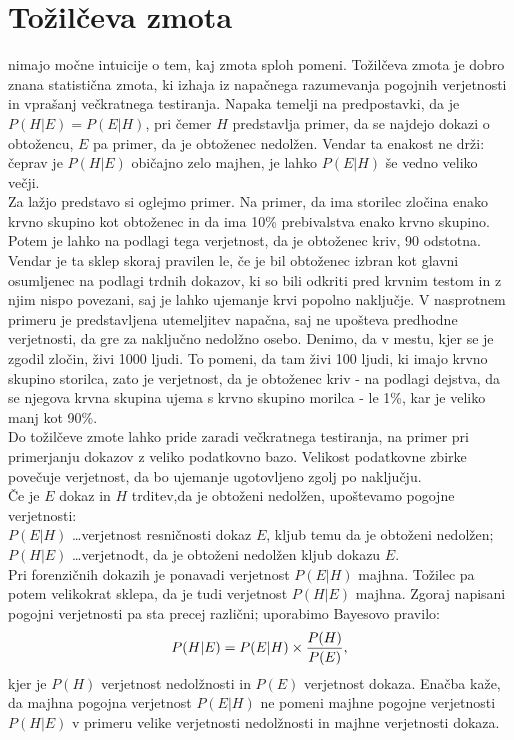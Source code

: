 \documentclass[12pt,a4paper]{amsart}
\theoremstyle{definition} %
\theoremstyle{plain} %
\begin{document}
\section{Tožilčeva zmota}
nimajo močne intuicije o tem, kaj zmota sploh pomeni. Tožilčeva zmota je dobro znana statistična zmota, ki izhaja iz napačnega razumevanja 
pogojnih verjetnosti in vprašanj večkratnega testiranja. Napaka temelji na predpostavki, da je $P(H \lvert E) = P(E \lvert H)$, pri čemer $H$ 
predstavlja primer, da se najdejo dokazi o obtožencu, $E$ pa primer, da je obtoženec nedolžen. Vendar ta enakost ne drži: čeprav je $P(H \lvert E)$ 
običajno zelo majhen, je lahko $P(E \lvert H)$ še vedno veliko večji. \\

Za lažjo predstavo si oglejmo primer. Na primer, da ima storilec zločina enako krvno skupino kot obtoženec in da ima 10\% prebivalstva 
enako krvno skupino. Potem je lahko na podlagi tega verjetnost, da je obtoženec kriv, 90 odstotna. Vendar je ta sklep skoraj pravilen le, če 
je bil obtoženec izbran kot glavni osumljenec na podlagi trdnih dokazov, ki so bili odkriti pred krvnim testom in z njim nispo povezani, saj 
je lahko ujemanje krvi popolno naključje. V nasprotnem primeru je predstavljena utemeljitev napačna, saj ne upošteva predhodne verjetnosti, da 
gre za naključno nedolžno osebo. Denimo, da v mestu, kjer se je zgodil zločin, živi 1000 ljudi. To pomeni, da tam živi 100 ljudi, ki imajo 
krvno skupino storilca, zato je verjetnost, da je obtoženec kriv - na podlagi dejstva, da se njegova krvna skupina ujema s krvno skupino 
morilca - le 1\%, kar je veliko manj kot 90\%. \\

Do tožilčeve zmote lahko pride zaradi večkratnega testiranja, na primer pri primerjanju dokazov z veliko podatkovno bazo. Velikost podatkovne 
zbirke povečuje verjetnost, da bo ujemanje ugotovljeno zgolj po naključju. \\

Če je $E$ dokaz in $H$ trditev,da je obtoženi nedolžen, upoštevamo pogojne verjetnosti: \\
$P(E \lvert H)$ \dots verjetnost resničnosti dokaz $E$, kljub temu da je obtoženi nedolžen; \\
$P(H \lvert E)$ \dots verjetnodt, da je obtoženi nedolžen kljub dokazu $E$. \\
Pri forenzičnih dokazih je ponavadi verjetnost $P(E \lvert H)$ majhna. Tožilec pa potem velikokrat sklepa, da je tudi verjetnost 
$P(H \lvert E)$ majhna.
Zgoraj napisani pogojni verjetnosti pa sta precej različni; uporabimo Bayesovo pravilo: \vspace{3mm}
\[P(H \lvert E) = P(E \lvert H) \times \frac{P(H)}{P(E)}, \vspace{3mm}\]
kjer je $P(H)$ verjetnost nedolžnosti in $P(E)$ verjetnost dokaza. Enačba kaže, da majhna pogojna verjetnost $P(E \lvert H)$ ne pomeni majhne 
pogojne verjetnosti $P(H \lvert E)$ v primeru velike verjetnosti nedolžnosti in majhne verjetnosti dokaza. \\
\end{document}
